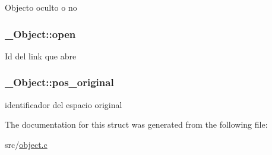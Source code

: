 Objecto oculto o no \hypertarget{struct__Object_a0922dd9891e6aa617ce1d51ae27c0175}{
\subsubsection[{open}]{ \+\_\+\+Object\+::open}}\label{struct__Object_a0922dd9891e6aa617ce1d51ae27c0175}
Id del link que abre \hypertarget{struct__Object_a42b5cf094a2df1756303245ea70dbb55}{
\subsubsection[{pos\+\_\+original}]{ \+\_\+\+Object\+::pos\+\_\+original}}\label{struct__Object_a42b5cf094a2df1756303245ea70dbb55}
identificador del espacio original 

The documentation for this struct was generated from the following file\+:\begin{DoxyCompactItemize}
\item 
src/\hyperlink{object_8c}{object.\+c}\end{DoxyCompactItemize}
